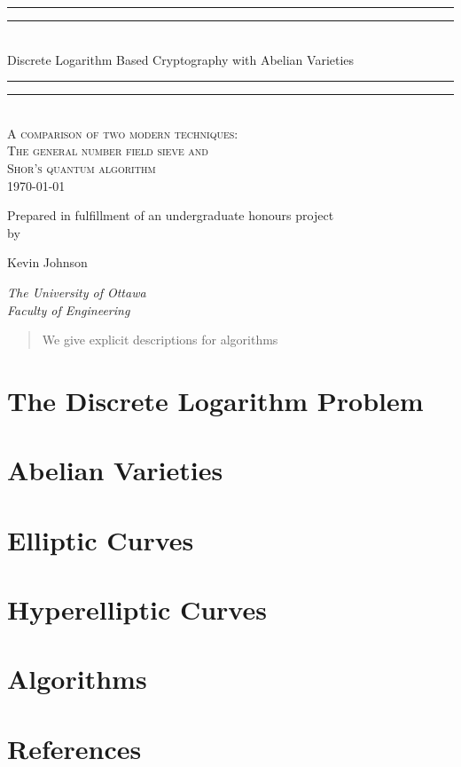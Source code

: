 \documentclass[10pt,a4paper]{article}
\theoremstyle{plain}
\theoremstyle{definition}
\theoremstyle{remark}
\newcommand*{\titleGP}{
  \begingroup %
    \centering %
    \vspace*{\baselineskip} %
    \rule{\textwidth}{1.6pt}\vspace*{-\baselineskip}\vspace*{2pt} %
    \rule{\textwidth}{0.4pt}\\[\baselineskip] %
    {\huge Discrete Logarithm Based Cryptography with Abelian Varieties}\\[0.2\baselineskip] %
    \rule{\textwidth}{0.4pt}\vspace*{-\baselineskip}\vspace{3.2pt} %
    \rule{\textwidth}{1.6pt}\\[\baselineskip] %
    \scshape %
    A comparison of two modern techniques: \\ %
    The general number field sieve and \\
    Shor's quantum algorithm  \\[\baselineskip] %
    \today \par %
    \vspace*{2\baselineskip} %
    Prepared in fulfillment of an undergraduate honours project  \\
    by \\[\baselineskip]
    {\Large Kevin Johnson \par} %
    \vspace*{2\baselineskip} 
    {\itshape The University of Ottawa \\ Faculty of Engineering \par} %
    \vspace*{3\baselineskip} 
    \begin{abstract}
      We give explicit descriptions for algorithms  
    \end{abstract}
    \vfill
  \endgroup
}
\begin{document}
  \titleGP
  \newpage
  \tableofcontents
  \newpage

    
  \section{The Discrete Logarithm Problem}
    
  \section{Abelian Varieties}
    
  \section{Elliptic Curves}
    
  \section{Hyperelliptic Curves}
    
  \section{Algorithms}
    
  \section{References}
    
\end{document}
